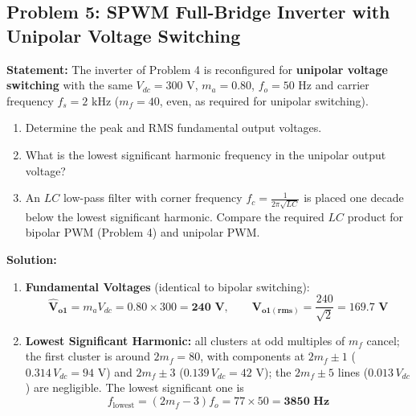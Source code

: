 \documentclass[11pt,a4paper]{article}
\let\origsubsection\subsection
\renewcommand{\subsection}{\Needspace{7\baselineskip}\origsubsection}
\begin{document}
\subsection{Problem 5: SPWM Full-Bridge Inverter with Unipolar Voltage Switching}
\begin{examplebox}
\textbf{Statement:} The inverter of Problem 4 is reconfigured for \textbf{unipolar voltage switching} with the same $V_{dc} = 300\text{ V}$, $m_a = 0.80$, $f_o = 50\text{ Hz}$ and carrier frequency $f_s = 2\text{ kHz}$ ($m_f = 40$, even, as required for unipolar switching).
\begin{enumerate}
  \item Determine the peak and RMS fundamental output voltages.
  \item What is the lowest significant harmonic frequency in the unipolar output voltage?
  \item An $LC$ low-pass filter with corner frequency $f_c = \frac{1}{2\pi\sqrt{LC}}$ is placed one decade below the lowest significant harmonic. Compare the required $LC$ product for bipolar PWM (Problem 4) and unipolar PWM.
\end{enumerate}

\tcblower
\textbf{Solution:}
\begin{enumerate}
  \item \textbf{Fundamental Voltages} (identical to bipolar switching):
  \begin{equation*}
  \mathbf{\hat{V}_{o1}} = m_a V_{dc} = 0.80 \times 300 = \mathbf{240\text{ V}}, \qquad \mathbf{V_{o1(rms)}} = \frac{240}{\sqrt{2}} = \mathbf{169.7\text{ V}}
  \end{equation*}

  \item \textbf{Lowest Significant Harmonic:} all clusters at odd multiples of $m_f$ cancel; the first cluster is around $2m_f = 80$, with components at $2m_f \pm 1$ ($0.314\,V_{dc} = 94\text{ V}$) and $2m_f \pm 3$ ($0.139\,V_{dc} = 42\text{ V}$); the $2m_f \pm 5$ lines ($0.013\,V_{dc}$) are negligible. The lowest significant one is
  \begin{equation*}
  f_{\text{lowest}} = (2m_f - 3) f_o = 77 \times 50 = \mathbf{3850\text{ Hz}}
  \end{equation*}


\end{enumerate}
\end{examplebox}
\end{document}
